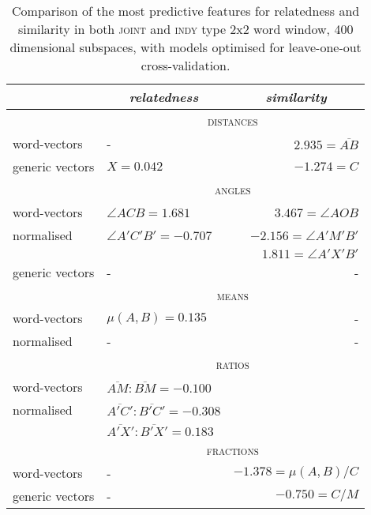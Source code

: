 \begin{table}
\centering
\begin{tabular}{llr}
\hline
& \multicolumn{1}{c}{\emph{relatedness}} & \multicolumn{1}{c}{\emph{similarity}} \\
\hline
& \multicolumn{2}{c}{\textsc{distances}} \\
word-vectors & - & $2.935 = \overline{AB}$ \\
generic vectors & $X = 0.042$ & $-1.274 = C$ \\
\hline
& \multicolumn{2}{c}{\textsc{angles}} \\
word-vectors & $\angle ACB = 1.681$ & $3.467 = \angle AOB$ \\
normalised & $\angle A'C'B' = -0.707$ & $-2.156 = \angle A'M'B'$ \\
& & $1.811 = \angle A'X'B'$ \\
generic vectors & - & - \\
\hline
& \multicolumn{2}{c}{\textsc{means}} \\
word-vectors & $\mu(A,B) = 0.135$ & - \\
normalised & - & - \\
\hline
& \multicolumn{2}{c}{\textsc{ratios}} \\
word-vectors & $\overline{AM}:\overline{BM} = -0.100$ \\
normalised & $\overline{A'C'}:\overline{B'C'} = -0.308$ \\
& $\overline{A'X'}:\overline{B'X'} = 0.183$ \\
\hline
& \multicolumn{2}{c}{\textsc{fractions}} \\
word-vectors & - & $-1.378 = \mu(A,B)/C$ \\
generic vectors & - & $-0.750 = C/M$ \\
\hline
\end{tabular}
\caption[Comparing Optimal Features for Relatedness and Similarity]{Comparison of the most predictive features for relatedness and similarity in both \textsc{joint} and \textsc{indy} type 2x2 word window, 400 dimensional subspaces, with models optimised for leave-one-out cross-validation.}
\label{tab:relsim-features}
\end{table}

